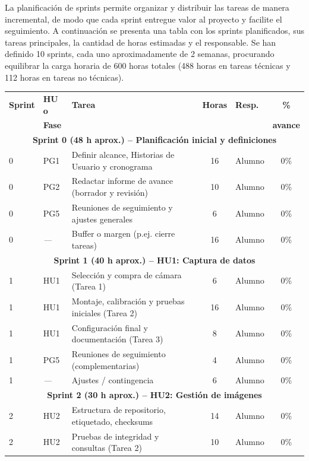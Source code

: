 \documentclass[
11pt, %
]{ProyectoVpC}
\begin{document}
La planificación de sprints permite organizar y distribuir las tareas de manera incremental, de modo que cada sprint entregue valor al proyecto y facilite el seguimiento. A continuación se presenta una tabla con los sprints planificados, sus tareas principales, la cantidad de horas estimadas y el responsable. Se han definido 10 sprints, cada uno aproximadamente de 2 semanas, procurando equilibrar la carga horaria de 600 horas totales (488 horas en tareas técnicas y 112 horas en tareas no técnicas).

\begin{center}
\begin{tabular}{|l|l|l|c|l|c|}
\hline
\textbf{Sprint} & \textbf{HU o} & \textbf{Tarea} & \textbf{Horas} & \textbf{Resp.} & \textbf{\%} \\
\textbf{} & \textbf{Fase} & \textbf{} & \textbf{} & \textbf{} & \textbf{avance} \\
\hline
\multicolumn{6}{|c|}{\textbf{Sprint 0 (48 h aprox.) -- Planificación inicial y definiciones}} \\
\hline
0 & PG1 & Definir alcance, Historias de Usuario y cronograma & 16 & Alumno & 0\% \\
0 & PG2 & Redactar informe de avance (borrador y revisión) & 10 & Alumno & 0\% \\
0 & PG5 & Reuniones de seguimiento y ajustes generales & 6 & Alumno & 0\% \\
0 & \textit{---} & Buffer o margen (p.ej. cierre tareas) & 16 & Alumno & 0\% \\
\hline
\multicolumn{6}{|c|}{\textbf{Sprint 1 (40 h aprox.) -- HU1: Captura de datos}} \\
\hline
1 & HU1 & Selección y compra de cámara (Tarea 1) & 6 & Alumno & 0\% \\
1 & HU1 & Montaje, calibración y pruebas iniciales (Tarea 2) & 16 & Alumno & 0\% \\
1 & HU1 & Configuración final y documentación (Tarea 3) & 8 & Alumno & 0\% \\
1 & PG5 & Reuniones de seguimiento (complementarias) & 4 & Alumno & 0\% \\
1 & \textit{---} & Ajustes / contingencia & 6 & Alumno & 0\% \\
\hline
\multicolumn{6}{|c|}{\textbf{Sprint 2 (30 h aprox.) -- HU2: Gestión de imágenes}} \\
\hline
2 & HU2 & Estructura de repositorio, etiquetado, checksums & 14 & Alumno & 0\% \\
2 & HU2 & Pruebas de integridad y consultas (Tarea 2) & 10 & Alumno & 0\% \\

\end{tabular}
\end{center}
\end{document}
